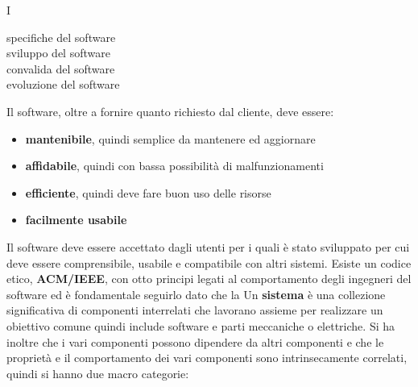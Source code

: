 \documentclass[a4paper,12pt, oneside]{book}
\begin{document}
I 

\begin{description}
    \item [specifiche del software]
    \item [sviluppo del software]
    \item [convalida del software]
    \item [evoluzione del software]
\end{description}
Il software, oltre a fornire quanto richiesto dal cliente, deve essere:
\begin{itemize}
\item \textbf{mantenibile}, quindi semplice da mantenere ed aggiornare
\item \textbf{affidabile}, quindi con bassa possibilità di malfunzionamenti
\item \textbf{efficiente}, quindi deve fare buon uso delle risorse
\item \textbf{facilmente usabile}
\end{itemize}
Il software deve essere accettato dagli utenti per i quali è stato sviluppato per cui deve essere comprensibile, 
usabile e compatibile con altri sistemi.
Esiste un codice etico, \textbf{ACM/IEEE}, con otto principi legati al comportamento degli ingegneri del software
ed è fondamentale seguirlo dato che la 
Un \textbf{sistema} è una collezione significativa di componenti interrelati che lavorano assieme per realizzare
un obiettivo comune quindi include software e parti meccaniche o elettriche.
Si ha inoltre che i vari componenti possono dipendere da altri componenti e che le proprietà
e il comportamento dei vari componenti sono intrinsecamente correlati, quindi si hanno due macro categorie:
\end{document}
